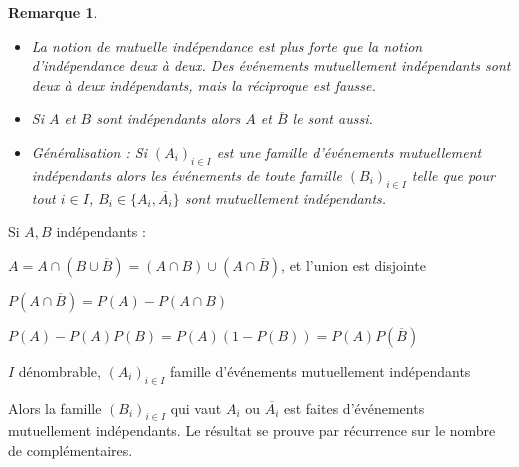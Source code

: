 \documentclass[a4paper,12pt]{book}
\newcommand{\Pre}[1]{\begin{tcolorbox}[sharp corners, colback=white,colframe=green!60!green!30!black!75, title=Preuve]#1\end{tcolorbox}}
\newtheorem{Rem}{Remarque}[section]
\begin{document}
\begin{Rem}\begin{itemize}
\item La notion de mutuelle indépendance est plus forte que la notion d'indépendance deux à deux. Des événements mutuellement indépendants sont deux à deux indépendants, mais la réciproque est fausse.
\item Si $A$ et $B$ sont indépendants alors $A$ et $\overline{B}$ le sont aussi.
\item Généralisation : Si $(A_i)_{i\in I}$ est une famille d'événements mutuellement indépendants alors les événements de toute famille $(B_i)_{i\in I}$ telle que pour tout $i\in I$, $B_i\in\{A_i, \overline{A_i}\}$ sont mutuellement indépendants.
\end{itemize}
\end{Rem}
\Pre{Si $A,B$ indépendants :
\par $A=A\cap(B\cup\overline{B})=(A\cap B)\cup (A\cap\overline{B})$, et l'union est disjointe
\par $P(A\cap\overline{B})=P(A)-P(A\cap B)$
\par $P(A)-P(A)P(B)=P(A)(1-P(B))=P(A)P(\overline{B})$
\par $I$ dénombrable, $(A_i)_{i\in I}$ famille d'événements mutuellement indépendants
\par Alors la famille $(B_i)_{i\in I}$ qui vaut $A_i$ ou $\overline{A_i}$ est faites d'événements mutuellement indépendants. Le résultat se prouve par récurrence sur le nombre de complémentaires.}
\end{document}
